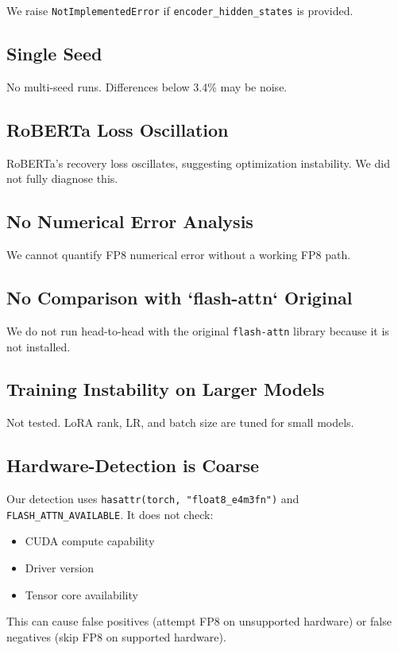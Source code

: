 We raise \texttt{NotImplementedError} if \texttt{encoder\_hidden\_states} is provided.

\subsection{Single Seed}

No multi-seed runs. Differences below 3.4\% may be noise.

\subsection{RoBERTa Loss Oscillation}

RoBERTa's recovery loss oscillates, suggesting optimization instability. 
We did not fully diagnose this.

\subsection{No Numerical Error Analysis}

We cannot quantify FP8 numerical error without a working FP8 path.

\subsection{No Comparison with `flash-attn` Original}

We do not run head-to-head with the original \texttt{flash-attn} library because 
it is not installed.

\subsection{Training Instability on Larger Models}

Not tested. LoRA rank, LR, and batch size are tuned for small models.

\subsection{Hardware-Detection is Coarse}

Our detection uses \texttt{hasattr(torch, "float8\_e4m3fn")} and 
\texttt{FLASH\_ATTN\_AVAILABLE}. It does not check:

\begin{itemize}
\item CUDA compute capability
\item Driver version
\item Tensor core availability

\end{itemize}
This can cause false positives (attempt FP8 on unsupported hardware) or 
false negatives (skip FP8 on supported hardware).

